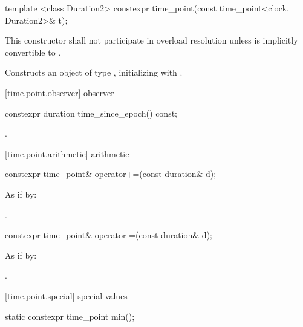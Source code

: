 %
\begin{itemdecl}
template <class Duration2>
  constexpr time_point(const time_point<clock, Duration2>& t);
\end{itemdecl}

\begin{itemdescr}
\pnum
\remarks This constructor shall not participate in overload resolution unless 
is implicitly convertible to .

\pnum
\effects Constructs an object of type , initializing
 with .
\end{itemdescr}

[time.point.observer]{ observer}

%
\begin{itemdecl}
constexpr duration time_since_epoch() const;
\end{itemdecl}

\begin{itemdescr}
\pnum
\returns {}.
\end{itemdescr}

[time.point.arithmetic]{ arithmetic}

%
\begin{itemdecl}
constexpr time_point& operator+=(const duration& d);
\end{itemdecl}

\begin{itemdescr}
\pnum
\effects As if by: 

\pnum
\returns {}.
\end{itemdescr}

%
\begin{itemdecl}
constexpr time_point& operator-=(const duration& d);
\end{itemdecl}

\begin{itemdescr}
\pnum
\effects As if by: 

\pnum
\returns {}.
\end{itemdescr}

[time.point.special]{ special values}

%
\begin{itemdecl}
static constexpr time_point min();
\end{itemdecl}

